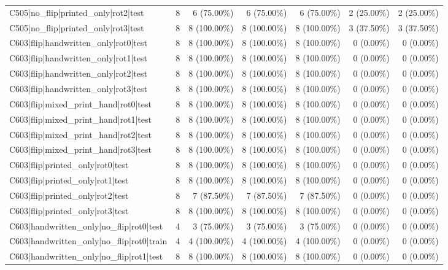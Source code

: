 \begin{longtable}{>{\raggedright\arraybackslash}p{5cm}rrrrrr}
C505|no\_flip|printed\_only|rot2|test & 8 & 6 (75.00\%) & 6 (75.00\%) & 6 (75.00\%) & 2 (25.00\%) & 2 (25.00\%) \\
C505|no\_flip|printed\_only|rot3|test & 8 & 8 (100.00\%) & 8 (100.00\%) & 8 (100.00\%) & 3 (37.50\%) & 3 (37.50\%) \\
C603|flip|handwritten\_only|rot0|test & 8 & 8 (100.00\%) & 8 (100.00\%) & 8 (100.00\%) & 0 (0.00\%) & 0 (0.00\%) \\
C603|flip|handwritten\_only|rot1|test & 8 & 8 (100.00\%) & 8 (100.00\%) & 8 (100.00\%) & 0 (0.00\%) & 0 (0.00\%) \\
C603|flip|handwritten\_only|rot2|test & 8 & 8 (100.00\%) & 8 (100.00\%) & 8 (100.00\%) & 0 (0.00\%) & 0 (0.00\%) \\
C603|flip|handwritten\_only|rot3|test & 8 & 8 (100.00\%) & 8 (100.00\%) & 8 (100.00\%) & 0 (0.00\%) & 0 (0.00\%) \\
C603|flip|mixed\_print\_hand|rot0|test & 8 & 8 (100.00\%) & 8 (100.00\%) & 8 (100.00\%) & 0 (0.00\%) & 0 (0.00\%) \\
C603|flip|mixed\_print\_hand|rot1|test & 8 & 8 (100.00\%) & 8 (100.00\%) & 8 (100.00\%) & 0 (0.00\%) & 0 (0.00\%) \\
C603|flip|mixed\_print\_hand|rot2|test & 8 & 8 (100.00\%) & 8 (100.00\%) & 8 (100.00\%) & 0 (0.00\%) & 0 (0.00\%) \\
C603|flip|mixed\_print\_hand|rot3|test & 8 & 8 (100.00\%) & 8 (100.00\%) & 8 (100.00\%) & 0 (0.00\%) & 0 (0.00\%) \\
C603|flip|printed\_only|rot0|test & 8 & 8 (100.00\%) & 8 (100.00\%) & 8 (100.00\%) & 0 (0.00\%) & 0 (0.00\%) \\
C603|flip|printed\_only|rot1|test & 8 & 8 (100.00\%) & 8 (100.00\%) & 8 (100.00\%) & 0 (0.00\%) & 0 (0.00\%) \\
C603|flip|printed\_only|rot2|test & 8 & 7 (87.50\%) & 7 (87.50\%) & 7 (87.50\%) & 0 (0.00\%) & 0 (0.00\%) \\
C603|flip|printed\_only|rot3|test & 8 & 8 (100.00\%) & 8 (100.00\%) & 8 (100.00\%) & 0 (0.00\%) & 0 (0.00\%) \\
C603|handwritten\_only|no\_flip|rot0|test & 4 & 3 (75.00\%) & 3 (75.00\%) & 3 (75.00\%) & 0 (0.00\%) & 0 (0.00\%) \\
C603|handwritten\_only|no\_flip|rot0|train & 4 & 4 (100.00\%) & 4 (100.00\%) & 4 (100.00\%) & 0 (0.00\%) & 0 (0.00\%) \\
C603|handwritten\_only|no\_flip|rot1|test & 8 & 8 (100.00\%) & 8 (100.00\%) & 8 (100.00\%) & 0 (0.00\%) & 0 (0.00\%) \\

\end{longtable}
